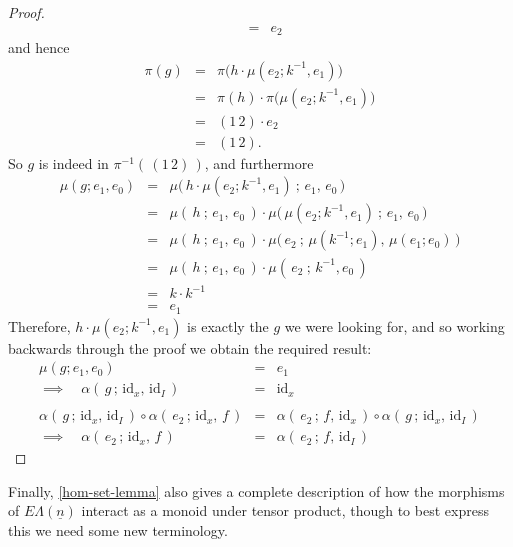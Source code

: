 \documentclass{amsbook} %
\newcommand{\ELn}{E\Lambda(\underline{n})}
\numberwithin{section}{chapter}
\begin{document}
\begin{proof}
\[\begin{array}{rll}
		& = & e_2
		\end{array}
\]
and hence
\[\begin{array}{rll}
		\pi(g) & = & \pi \big( h \cdot \mu(e_2; k^{-1}, e_1) \big) \\
		& = & \pi(h) \cdot \pi \big(\mu(e_2; k^{-1}, e_1) \big) \\
		& = & (1 \, 2) \cdot e_2 \\
		& = & (1 \, 2)
		.\end{array}
\]
So $g$ is indeed in $\pi^{-1}( \, (1 \, 2) \, )$, and furthermore
\[\begin{array}{rll}
		\mu(g; e_1, e_0) & = & \mu \big( \, h \cdot \mu(e_2; k^{-1}, e_1) \ ; \, e_1, \, e_0 \, \big) \\
		& = & \mu( \, h \ ; \, e_1, \, e_0 \, ) \cdot \mu \big( \, \mu(e_2; k^{-1}, e_1) \ ; \, e_1, \, e_0 \, \big) \\
		& = & \mu( \, h \ ; \, e_1, \, e_0 \, ) \cdot \mu \big( \, e_2 \ ; \, \mu(k^{-1}; e_1), \, \mu(e_1; e_0) \, \big) \\
		& = & \mu( \, h \ ; \, e_1, \, e_0 \, ) \cdot \mu( \, e_2 \ ; \, k^{-1}, e_0 \, ) \\
		& = & k \cdot k^{-1} \\
		& = & e_1
		\end{array}
\]
Therefore, $h \cdot \mu(e_2; k^{-1}, e_1)$ is exactly the $g$ we were looking for, and so working backwards through the proof we obtain the required result:
\[ \begin{array}{rll}
		\mu(g; e_1, e_0) & = & e_1 \\
		\implies \quad \alpha( \, g \, ; \, \mathrm{id}_x, \, \mathrm{id}_I \, ) & = & \mathrm{id}_x \\
		& & \\
		\alpha( \, g \, ; \, \mathrm{id}_x, \, \mathrm{id}_I \, ) \circ \alpha( \, e_2 \, ; \, \mathrm{id}_x, \, f \, ) & = & \alpha( \, e_2 \, ; \, f, \, \mathrm{id}_x \, ) \circ \alpha( \, g \, ; \, \mathrm{id}_x, \, \mathrm{id}_I \, ) \\
		\implies \quad \alpha( \, e_2 \, ; \, \mathrm{id}_x, \, f \, ) & = & \alpha( \, e_2 \, ; \, f, \, \mathrm{id}_I \, )
		\end{array}
\]
\end{proof} 

Finally, \cref{hom-set-lemma} also gives a complete description of how the morphisms of $\ELn$ interact as a monoid under tensor product, though to best express this we need some new terminology.
\end{document}
